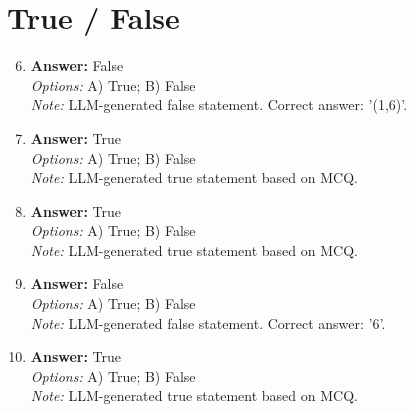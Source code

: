\documentclass[12pt]{article}
\begin{document}
\section*{True / False}
\begin{enumerate}[label=\arabic*.]
\setcounter{enumi}{5}
\item \textbf{Answer:} False
\\ \textit{Options:} A) True; B) False
\\ \textit{Note:} LLM-generated false statement. Correct answer: '(1,6)'.
\item \textbf{Answer:} True
\\ \textit{Options:} A) True; B) False
\\ \textit{Note:} LLM-generated true statement based on MCQ.
\item \textbf{Answer:} True
\\ \textit{Options:} A) True; B) False
\\ \textit{Note:} LLM-generated true statement based on MCQ.
\item \textbf{Answer:} False
\\ \textit{Options:} A) True; B) False
\\ \textit{Note:} LLM-generated false statement. Correct answer: '6'.
\item \textbf{Answer:} True
\\ \textit{Options:} A) True; B) False
\\ \textit{Note:} LLM-generated true statement based on MCQ.
\end{enumerate}
\end{document}
